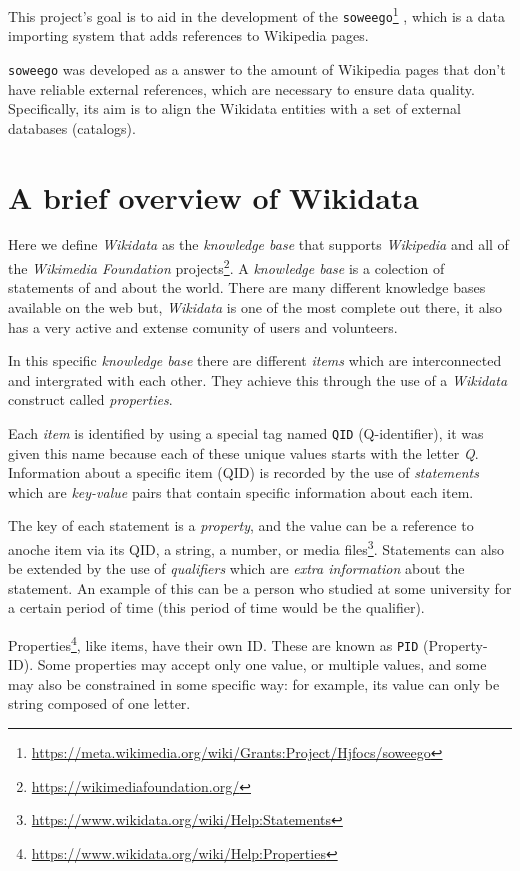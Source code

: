 \documentclass[epsfig,a4paper,11pt,titlepage,twoside,openany]{book}
\newcommand{\footurl}[1]{\footnote{\url{#1}}}
\begin{document}
This project's goal is to aid in the development of the
\texttt{soweego}\footurl{https://meta.wikimedia.org/wiki/Grants:Project/Hjfocs/soweego}
, which is a data importing system that adds references to Wikipedia
pages.

\texttt{soweego} was developed as a answer to the amount of Wikipedia pages that
don't have reliable external references, which are necessary to ensure data
quality. Specifically, its aim is to align the Wikidata entities with a set of
external databases (catalogs).


\section{A brief overview of Wikidata}
\label{sec:intro-wikidata}

Here we define \textit{Wikidata} as the \textit{knowledge base} that supports
\textit{Wikipedia} and all of the \textit{Wikimedia Foundation}
projects\footurl{https://wikimediafoundation.org/}. A \textit{knowledge base} is a colection of statements of and about the world. There are many different knowledge bases available on the web but, \textit{Wikidata} is one of the most complete out there, it also has a very active and extense comunity of users and volunteers. 

In this specific \textit{knowledge base} there are different \textit{items} which are interconnected and intergrated with each other. They achieve this through the use of a \textit{Wikidata} construct called 
\textit{properties}. 

Each \textit{item} is identified by using a special tag named \texttt{QID} (Q-identifier), it was given this name because each of these unique values starts with the letter \textit{Q}. Information about a specific item (QID) is
recorded by the use of \textit{statements} which are \textit{key-value} pairs
that contain specific information about each item.

The key of each statement is a \textit{property}, and the value can be a reference to anoche item via its QID, a string, a number, or media
files\footurl{https://www.wikidata.org/wiki/Help:Statements}. Statements can
also be extended by the use of \textit{qualifiers} which are \textit{extra information} about the
statement. An example of this can be a person who studied at some university for
a certain period of time (this period of time would be the qualifier).

Properties\footurl{https://www.wikidata.org/wiki/Help:Properties}, like items,
have their own ID. These are known as \texttt{PID} (Property-ID). Some properties may accept only one value, or multiple values, and
some may also be constrained in some specific way: for example, its value can
only be string composed of one letter.
\end{document}
